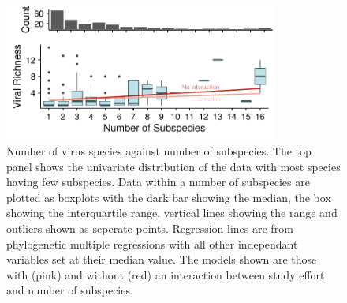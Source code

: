 		
		























\begin{knitrout}\footnotesize
{}\color{fgcolor}\begin{figure}[t]

{\centering \includegraphics[width=0.8\textwidth]{figure/boxplot-1} 

}

\caption[Number of virus species against number of subspecies]{Number of virus species against number of subspecies. 		
The top panel shows the univariate distribution of the data with most species having few subspecies.		
Data within a number of subspecies are plotted as boxplots with the dark bar showing the median, the box showing the interquartile range, vertical lines showing the range and outliers shown as seperate points.		
Regression lines are from phylogenetic multiple regressions with all other independant variables set at their median value.		
The models shown are those with (pink) and without (red) an interaction between study effort and number of subspecies.		
}\label{fig:boxplot}
\end{figure}


\end{knitrout}



